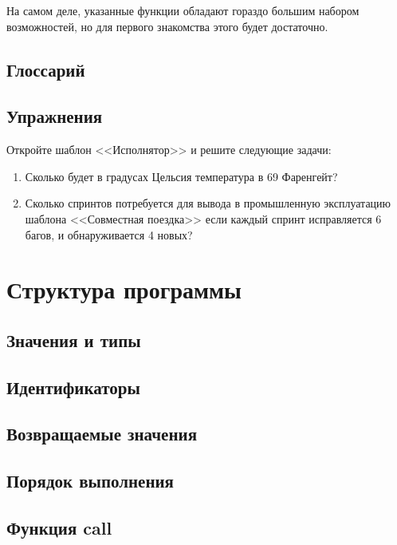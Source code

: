 \documentclass[10pt]{book}
\begin{document}
	На самом деле, указанные функции обладают гораздо большим набором возможностей, но для первого знакомства этого будет достаточно. 
		
	\section{Глоссарий}
		
	\section{Упражнения}
	
	Откройте шаблон <<Исполнятор>> и решите следующие задачи:
	
	\begin{enumerate}
		\item Сколько будет в градусах Цельсия температура в 69 Фаренгейт?
		
		\item Сколько спринтов потребуется для вывода в промышленную эксплуатацию шаблона <<Совместная поездка>> если каждый спринт исправляется 6 багов, и обнаруживается 4 новых?
	\end{enumerate}
	
	
	\chapter{Структура программы}
	
	\section{Значения и типы}
	
	\section{Идентификаторы}
	
	\section{Возвращаемые значения}
	
	\section{Порядок выполнения}
	
	\section{Функция call}
	
\end{document}
